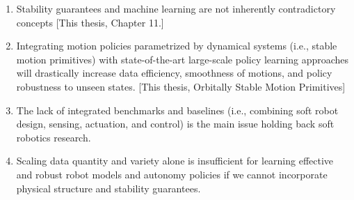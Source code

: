 \documentclass{propositions}
\begin{document}
\begin{enumerate}
    \item Stability guarantees and machine learning are not inherently contradictory concepts [This thesis, Chapter 11.]
    \item Integrating motion policies parametrized by dynamical systems (i.e., stable motion primitives) with state-of-the-art large-scale policy learning approaches will drastically increase data efficiency, smoothness of motions, and policy robustness to unseen states. [This thesis, Orbitally Stable Motion Primitives]
    \item The lack of integrated benchmarks and baselines (i.e., combining soft robot design, sensing, actuation, and control) is the main issue holding back soft robotics research.
    \item Scaling data quantity and variety alone is insufficient for learning effective and robust robot models and autonomy policies if we cannot incorporate physical structure and stability guarantees.

\end{enumerate}
\end{document}

